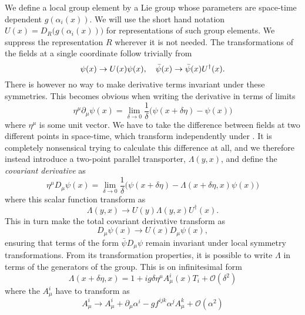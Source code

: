 We define a local group element by a Lie group whose parameters are space-time
dependent $g(\alpha_i(x))$. We will use the short hand notation $U(x) =
D_R\big(g(\alpha_i(x))\big)$ for representations of such group elements. We
suppress the representation $R$ wherever it is not needed. The transformations
of the fields at a single coordinate follow trivially from
%
\begin{equation} \label{eq:local_trafo}
  \psi(x) \to U(x) \psi(x), \hskip1em \bar{\psi}(x) \to \bar{\psi}(x)
  U^{\dagger}(x).
\end{equation}
%
There is however no way to make derivative terms invariant under these
symmetries. This becomes obvious when writing the derivative in terms of limits
%
\begin{equation}
  \eta^{\mu} \partial_{\mu} \psi(x) = \lim_{\delta \to 0} \frac{1}{\delta} \big(
    \psi(x + \delta\eta) - \psi(x) \big)
\end{equation}
%
where $\eta^{\mu}$ is some unit vector. We have to take the difference between
fields at two different points in space-time, which transform independently
under . It is completely nonsensical trying to calculate
this difference at all, and we therefore instead introduce a two-point parallel
transporter, $\Lambda(y,x)$, and define the \emph{covariant derivative} as
%
\begin{equation}
  \eta^{\mu} D_{\mu} \psi(x) = \lim_{\delta \to 0} \frac{1}{\delta} \big(
    \psi(x + \delta\eta) - \Lambda(x+\delta\eta,x)\psi(x) \big)
\end{equation}
%
where this scalar function transform as
%
\begin{equation}
  \Lambda(y,x) \to U(y) \Lambda(y,x) U^{\dagger}(x).
\end{equation}
%
This in turn make the total covariant derivative transform as
%
\begin{equation}
  D_{\mu}\psi(x) \to U(x) D_{\mu} \psi(x),
\end{equation}
%
ensuring that terms of the form $\bar{\psi} D_{\mu} \psi$ remain invariant under
local symmetry transformations. From its transformation properties, it is
possible to write $\Lambda$ in terms of the generators of the group. This is on
infinitesimal form
%
\begin{equation}
  \Lambda(x + \delta\eta,x) = 1 + i g \delta \eta^{\mu} A^i_{\mu}(x) T_i +
    \mathcal{O}(\delta^2)
\end{equation}
%
where the $A^i_{\mu}$ have to transform as
%
\begin{equation}
  A^i_{\mu} \to A^i_{\mu} + \partial_{\mu} \alpha^i - g f^{ijk} \alpha^j A^k_{\mu}
    + \mathcal{O}(\alpha^2)
\end{equation}
